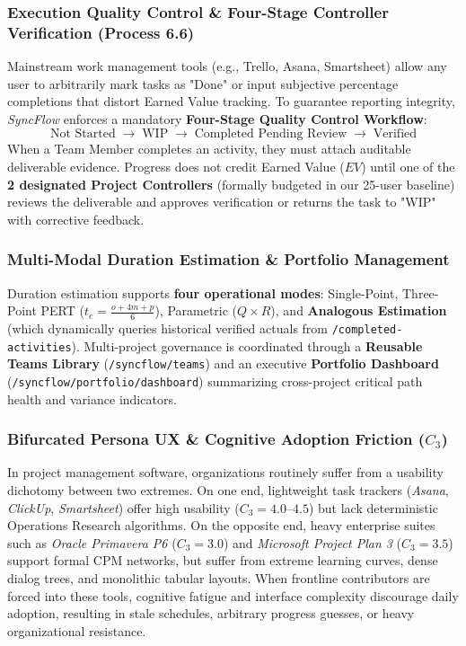 \subsubsection{Execution Quality Control \& Four-Stage Controller Verification (Process 6.6)}
Mainstream work management tools (e.g., Trello, Asana, Smartsheet) allow any user to arbitrarily mark tasks as "Done" or input subjective percentage completions that distort Earned Value tracking. To guarantee reporting integrity, \textit{SyncFlow} enforces a mandatory \textbf{Four-Stage Quality Control Workflow}:
\begin{equation*}
    \text{Not Started} \;\xrightarrow{\quad}\; \text{WIP} \;\xrightarrow{\quad}\; \text{Completed Pending Review} \;\xrightarrow{\quad}\; \text{Verified}
\end{equation*}
When a Team Member completes an activity, they must attach auditable deliverable evidence. Progress does not credit Earned Value ($EV$) until one of the \textbf{2 designated Project Controllers} (formally budgeted in our 25-user baseline) reviews the deliverable and approves verification or returns the task to "WIP" with corrective feedback.

\subsubsection{Multi-Modal Duration Estimation \& Portfolio Management}
Duration estimation supports \textbf{four operational modes}: Single-Point, Three-Point PERT ($t_e = \frac{o + 4m + p}{6}$), Parametric ($Q \times R$), and \textbf{Analogous Estimation} (which dynamically queries historical verified actuals from \texttt{/completed-activities}). Multi-project governance is coordinated through a \textbf{Reusable Teams Library} (\texttt{/syncflow/teams}) and an executive \textbf{Portfolio Dashboard} (\texttt{/syncflow/portfolio/dashboard}) summarizing cross-project critical path health and variance indicators.

\subsubsection{Bifurcated Persona UX \& Cognitive Adoption Friction ($C_3$)}
In project management software, organizations routinely suffer from a usability dichotomy between two extremes. On one end, lightweight task trackers (\textit{Asana}, \textit{ClickUp}, \textit{Smartsheet}) offer high usability ($C_3 = 4.0\text{--}4.5$) but lack deterministic Operations Research algorithms. On the opposite end, heavy enterprise suites such as \textit{Oracle Primavera P6} ($C_3 = 3.0$) and \textit{Microsoft Project Plan 3} ($C_3 = 3.5$) support formal CPM networks, but suffer from extreme learning curves, dense dialog trees, and monolithic tabular layouts. When frontline contributors are forced into these tools, cognitive fatigue and interface complexity discourage daily adoption, resulting in stale schedules, arbitrary progress guesses, or heavy organizational resistance.


